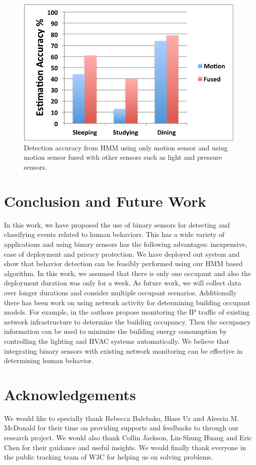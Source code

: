\documentclass[10pt, conference, compsocconf]{IEEEtran}
\begin{document}
\begin{figure}
\begin{center}
\includegraphics[width=0.7\columnwidth]{plot2-crop}
\end{center}
\caption{Detection accuracy from HMM using only motion sensor and using motion sensor fused with other sensors such as light and pressure sensors.}
\label{fig:plot2-crop}
\end{figure}


\section{Conclusion and Future Work}
In this work, we have proposed the use of binary sensors for detecting and classifying events related to human behaviors. This has a wide variety of applications and using binary sensors has the following advantages: inexpensive, ease of deployment and privacy protection. We have deployed out system and show that behavior detection can be feasibly performed using our HMM based algorithm. In this work, we assumed that there is only one occupant and also the deployment duration was only for a week. As future work, we will collect data over longer durations and consider multiple occupant scenarios.
Additionally there has been work on using network activity for determining building occupant models. For example, in \cite{wifi} the authors propose monitoring the IP traffic of existing network infrastructure to determine the building occupancy. Then the occupancy information can be used to minimize the building energy consumption by controlling the lighting and HVAC systems automatically. We believe that integrating binary sensors with existing network monitoring can be effective in determining human behavior.

\section{Acknowledgements}
We would like to specially thank Rebecca Balebako, Blase Ur and Aleecia M. McDonald for their time on providing supports and feedbacks to through our research project. We would also thank Collin Jackson, Lin-Shung Huang and Eric Chen for their guidance and useful insights. We would finally thank everyone in the public tracking team of W3C for helping us on solving problems.
\end{document}
